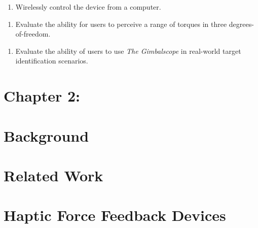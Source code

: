 \documentclass[a4paper]{article}
\newcounter{saveenum}
\newcommand\liststyleWWNumxxiii{%
\renewcommand\theenumi{\arabic{enumi}}
\renewcommand\theenumii{\arabic{enumi}.\arabic{enumii}}
\renewcommand\theenumiii{\arabic{enumi}.\arabic{enumii}.\arabic{enumiii}}
\renewcommand\theenumiv{\arabic{enumi}.\arabic{enumii}.\arabic{enumiii}.\arabic{enumiv}}
\renewcommand\labelenumi{\theenumi}
\renewcommand\labelenumii{\theenumii}
\renewcommand\labelenumiii{\theenumiii}
\renewcommand\labelenumiv{\theenumiv}
}
\begin{document}
\bigskip

\liststyleWWNumxxiii
\setcounter{saveenum}{\value{enumi}}
\begin{enumerate}
\setcounter{enumi}{\value{saveenum}}
\item Wirelessly control the device from a computer.
\end{enumerate}

\bigskip

\liststyleWWNumxxiii
\setcounter{saveenum}{\value{enumi}}
\begin{enumerate}
\setcounter{enumi}{\value{saveenum}}
\item Evaluate the ability for users to perceive a range of torques in three degrees-of-freedom.
\end{enumerate}

\bigskip

\liststyleWWNumxxiii
\setcounter{saveenum}{\value{enumi}}
\begin{enumerate}
\setcounter{enumi}{\value{saveenum}}
\item Evaluate the ability of users to use \textit{The Gimbalscope} in real-world target identification scenarios.
\end{enumerate}

\bigskip


\bigskip


\bigskip


\bigskip


\bigskip


\bigskip


\bigskip


\bigskip


\bigskip

\section[Chapter 2:]{\textbf{Chapter 2:}}
\hypertarget{Toc98342033}{}\section[Background]{\textbf{Background}}
\section[Related Work]{\textbf{Related Work}}
\section[Haptic Force Feedback Devices]{\textbf{Haptic Force Feedback Devices}}
\end{document}
